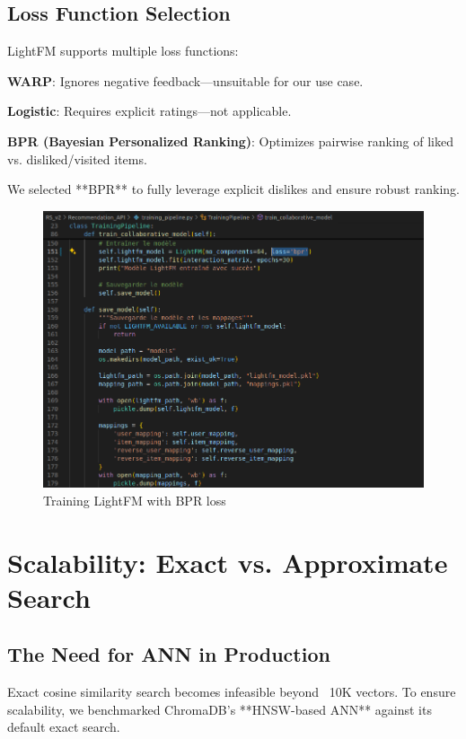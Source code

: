 \subsection{Loss Function Selection}
LightFM supports multiple loss functions:
\item \textbf{WARP}: Ignores negative feedback—unsuitable for our use case.
    \item \textbf{Logistic}: Requires explicit ratings—not applicable.
    \item \textbf{BPR (Bayesian Personalized Ranking)}: Optimizes pairwise ranking of liked vs. disliked/visited items.

We selected **BPR** to fully leverage explicit dislikes and ensure robust ranking.

\begin{figure}[H]
\centering
\includegraphics[scale=0.39]{images/loss_function_lightFM.png}
\caption{Training LightFM with BPR loss}
\label{fig:BPR_loss_function}
\end{figure}

\section{Scalability: Exact vs. Approximate Search}
\subsection{The Need for ANN in Production}
Exact cosine similarity search becomes infeasible beyond ~10K vectors. To ensure scalability, we benchmarked ChromaDB’s **HNSW-based ANN** against its default exact search.

